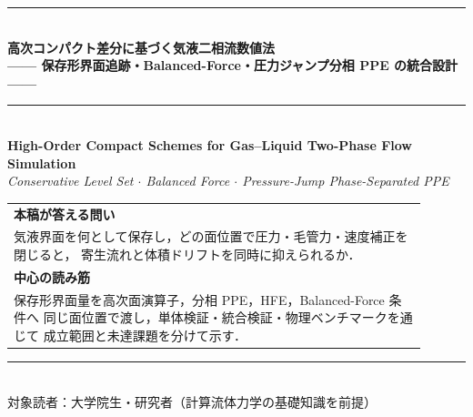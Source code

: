 \begin{titlepage}
\begin{center}
\vspace*{12mm}
{\color{navy}\rule{\linewidth}{2pt}}\\[8pt]
{\LARGE\bfseries 高次コンパクト差分に基づく気液二相流数値法}\\[6pt]
{\large\bfseries —— 保存形界面追跡・Balanced-Force・圧力ジャンプ分相 PPE の統合設計 ——}\\[4pt]
{\color{navy}\rule{\linewidth}{2pt}}\\[10pt]
{\large
\textbf{High-Order Compact Schemes for Gas--Liquid Two-Phase Flow Simulation}\\[4pt]
\textit{Conservative Level Set $\cdot$ Balanced Force $\cdot$ Pressure-Jump Phase-Separated PPE}
}
\vspace{14mm}
\begin{tcolorbox}[mybox, width=0.88\textwidth]
\small\centering
\begin{tabular}{@{}p{0.9\linewidth}@{}}
\textbf{本稿が答える問い}\\[3pt]
気液界面を何として保存し，どの面位置で圧力・毛管力・速度補正を閉じると，
寄生流れと体積ドリフトを同時に抑えられるか．\\[6pt]
\textbf{中心の読み筋}\\[3pt]
保存形界面量を高次面演算子，分相 PPE，HFE，Balanced-Force 条件へ
同じ面位置で渡し，単体検証・統合検証・物理ベンチマークを通じて
成立範囲と未達課題を分けて示す．
\end{tabular}
\end{tcolorbox}
\end{center}
\vfill
{\color{navy}\rule{\linewidth}{0.8pt}}\\[2pt]
{\small\color{darkgray}対象読者：大学院生・研究者（計算流体力学の基礎知識を前提）}
\end{titlepage}

